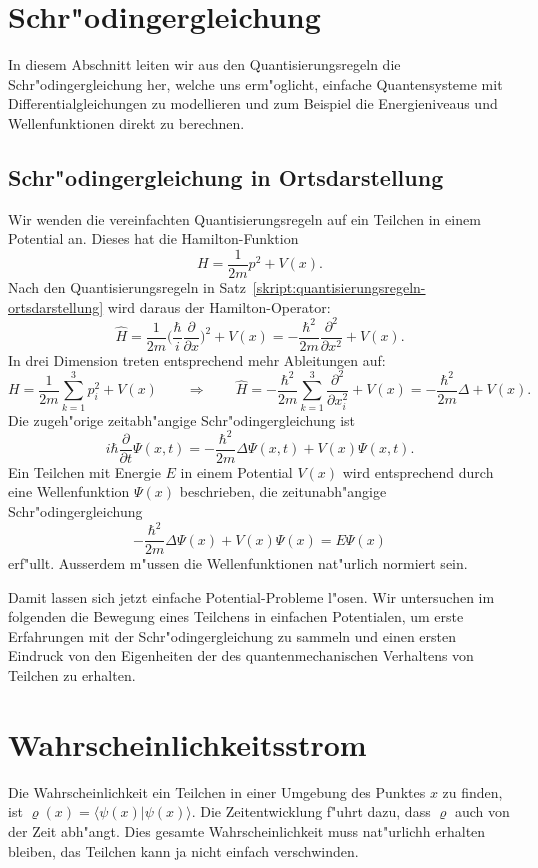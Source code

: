 \section{Schr"odingergleichung}
In diesem Abschnitt leiten wir aus den Quantisierungsregeln die
Schr"odingergleichung her, welche uns erm"oglicht, einfache
Quantensysteme mit Differentialgleichungen zu modellieren
und zum Beispiel die Energieniveaus und Wellenfunktionen direkt
zu berechnen.

\subsection{Schr"odingergleichung in Ortsdarstellung}
Wir wenden die vereinfachten Quantisierungsregeln auf ein
Teilchen in einem Potential an.
Dieses hat die Hamilton-Funktion
\[
H=\frac1{2m}p^2+V(x).
\]
Nach den Quantisierungsregeln in
Satz~\ref{skript:quantisierungsregeln-ortsdarstellung} wird daraus
der Hamilton-Operator:
\[
\hat H
=
\frac{1}{2m}\biggl(\frac{\hbar}{i}\frac{\partial }{\partial x}\biggr)^2
+V(x)
=
-\frac{\hbar^2}{2m}\frac{\partial^2}{\partial x^2}+V(x).
\]
In drei Dimension treten entsprechend mehr Ableitungen auf:
\[
H=\frac1{2m}\sum_{k=1}^3p_i^2+V(x)
\qquad\Rightarrow\qquad
\hat H
=
-\frac{\hbar^2}{2m}\sum_{k=1}^3\frac{\partial^2}{\partial x_i^2}+V(x)
=
-\frac{\hbar^2}{2m}\Delta + V(x).
\]
Die zugeh"orige zeitabh"angige Schr"odingergleichung ist
\[
i\hbar\frac{\partial}{\partial t}\Psi(x,t)
=
-\frac{\hbar^2}{2m}\Delta\Psi(x,t) + V(x)\Psi(x,t).
\]
Ein Teilchen mit Energie $E$ in einem Potential $V(x)$ wird entsprechend
durch eine Wellenfunktion $\Psi(x)$ beschrieben, die zeitunabh"angige
Schr"odingergleichung
\[
-\frac{\hbar^2}{2m}\Delta\Psi(x) + V(x)\Psi(x)
=
E\Psi(x)
\]
erf"ullt.
Ausserdem m"ussen die Wellenfunktionen nat"urlich normiert sein.

Damit lassen sich jetzt einfache Potential-Probleme l"osen.
Wir untersuchen im folgenden die Bewegung eines Teilchens in einfachen
Potentialen, um erste Erfahrungen mit der Schr"odingergleichung
zu sammeln und einen ersten Eindruck von den Eigenheiten der
des quantenmechanischen Verhaltens von Teilchen zu erhalten.




\section{Wahrscheinlichkeitsstrom}
Die Wahrscheinlichkeit ein Teilchen in einer Umgebung des
Punktes $x$ zu finden, ist $\varrho(x)=\langle \psi(x)|\psi(x)\rangle$.
Die Zeitentwicklung f"uhrt dazu, dass $\varrho$ auch von der
Zeit abh"angt.
Dies gesamte Wahrscheinlichkeit muss nat"urlichh erhalten bleiben,
das Teilchen kann ja nicht einfach verschwinden.

